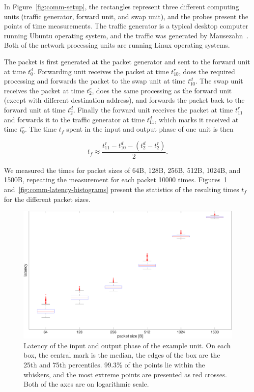 In Figure~\ref{fig:comm-setup}, the rectangles represent three different computing units (traffic generator, forward unit, and swap unit), and the probes present the points of time measurements. The traffic generator is a typical desktop computer running Ubuntu operating system, and the traffic was generated by Mausezahn~\cite{mausezahn}. Both of the network processing units are running Linux operating systems.

The packet is first generated at the packet generator and sent to the forward unit at time $t^{d}_{0}$. Forwarding unit receives the packet at time $t^{r}_{10}$, does the required processing and forwards the packet to the swap unit at time $t^{d}_{10}$. The swap unit receives the packet at time $t^{r}_{2}$, does the same processing as the forward unit (except with different destination address), and forwards the packet back to the forward unit at time $t^{d}_{2}$. Finally the forward unit receives the packet at time $t^{r}_{11}$ and forwards it to the traffic generator at time $t^{d}_{11}$, which marks it received at time $t^{r}_{0}$. The time $t_{f}$ spent in the input and output phase of one unit is then

\begin{equation}
  \label{eq:1}
  t_{f} \approx \frac{t^{r}_{11} - t^{d}_{10} - (t^{d}_{2} - t^{r}_{2})}{2}.
\end{equation}

We measured the times for packet sizes of 64B, 128B, 256B, 512B, 1024B, and 1500B, repeating the measurement for each packet 10000 times. Figures~\ref{fig:comm-latency-boxplot} and~\ref{fig:comm-latency-histograms} present the statistics of the resulting times $t_{f}$ for the different packet sizes.

\begin{figure}[]
  \begin{center}
    \includegraphics[width=\textwidth]{images/comm-latency-boxplot.pdf}
    \caption{Latency of the input and output phase of the example unit. On each box, the central mark is the median, the edges of the box are the 25th and 75th percentiles. 99.3\% of the points lie within the whiskers, and the most extreme points are presented as red crosses. Both of the axes are on logarithmic scale.}
    \label{fig:comm-latency-boxplot}
  \end{center}
\end{figure}

